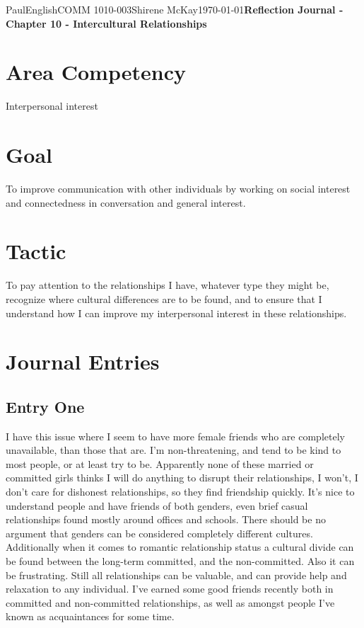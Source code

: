 \documentclass[12pt,letterpaper]{article}
\begin{document}
\begin{mla}{Paul}{English}{COMM 1010-003}{Shirene
    McKay}{\today}{\textbf{Reflection Journal - Chapter 10 - Intercultural Relationships}}
    
\section{Area Competency}

Interpersonal interest 

\section{Goal}

To improve communication with other individuals by working on social interest and connectedness in conversation and general interest.

\section{Tactic}

To pay attention to the relationships I have, whatever type they might be, recognize where cultural differences are to be found, and to ensure that I understand how I can improve my interpersonal interest in these relationships.

\section{Journal Entries}

\subsection{Entry One}

I have this issue where I seem to have more female friends who are completely unavailable, than those that are. I'm non-threatening, and tend to be kind to most people, or at least try to be. Apparently none of these married or committed girls thinks I will do anything to disrupt their relationships, I won't, I don't care for dishonest relationships, so they find friendship quickly. It's nice to understand people and have friends of both genders, even brief casual relationships found mostly around offices and schools. There should be no argument that genders can be considered completely different cultures. Additionally when it comes to romantic relationship status a cultural divide can be found between the long-term committed, and the non-committed. Also it can be frustrating. Still all relationships can be valuable, and can provide help and relaxation to any individual. I've earned some good friends recently both in committed and non-committed relationships, as well as amongst people I've known as acquaintances for some time.


\end{mla}
\end{document}
